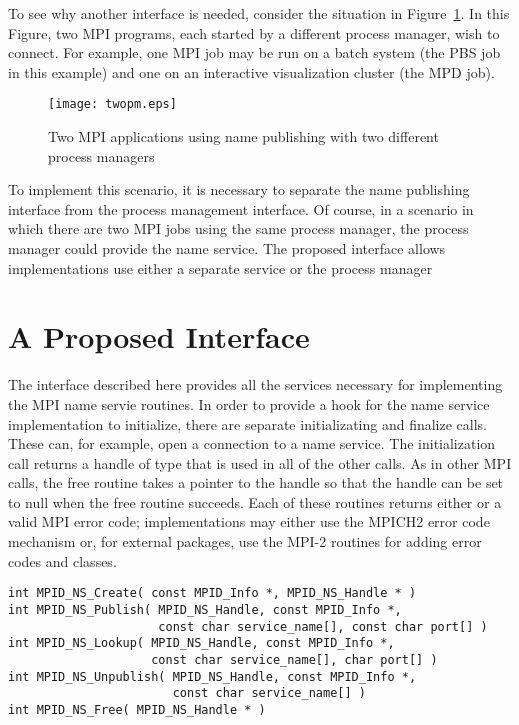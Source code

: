\documentclass{article}
\begin{document}
To see why another interface is needed, consider the situation in
Figure~\ref{fig:multiple-pm}.  In this Figure, two MPI programs, each
started by a different process manager, wish to connect.  For example,
one MPI job may be run on a batch system (the PBS job in this example)
and one on an interactive visualization cluster (the MPD job).  

\begin{figure}
\centerline{\texttt{[image: twopm.eps]}}
\caption{Two MPI applications using name publishing with two different
process managers}\label{fig:multiple-pm}
\end{figure}

To implement this scenario, it is necessary to separate the name
publishing interface from the process management interface.  
Of course, in a scenario in which there are two MPI jobs using the
same process manager, the process manager could provide the name
service.  The proposed interface allows implementations use either a
separate service or the process manager

\section{A Proposed Interface}
\label{sec:name-interface}

The interface described here provides all the services necessary for
implementing the MPI name servie routines.  In order to provide a hook
for the name service implementation to initialize, there are separate
initializating and finalize calls.  These can, for example, open a
connection to a name service.  The initialization call returns a
handle of type  that is used in all of the other
calls.  As in other MPI calls, the free routine takes a pointer to the
handle so that the handle can be set to null when the free routine
succeeds.  Each of these routines returns either  or
a valid MPI error code; implementations may either use the MPICH2
error code mechanism or, for external packages, use the MPI-2 routines
for adding error codes and classes.

\begin{verbatim}
int MPID_NS_Create( const MPID_Info *, MPID_NS_Handle * )
int MPID_NS_Publish( MPID_NS_Handle, const MPID_Info *, 
                     const char service_name[], const char port[] )
int MPID_NS_Lookup( MPID_NS_Handle, const MPID_Info *,
                    const char service_name[], char port[] )
int MPID_NS_Unpublish( MPID_NS_Handle, const MPID_Info *, 
                       const char service_name[] )
int MPID_NS_Free( MPID_NS_Handle * )
\end{verbatim}
\end{document}
